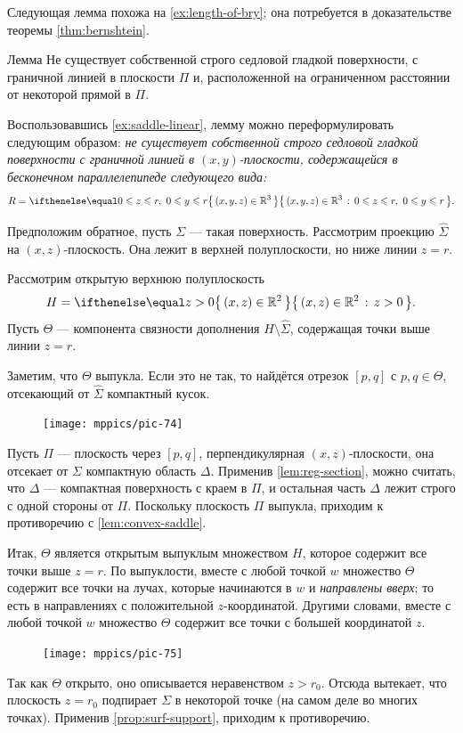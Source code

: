 Следующая лемма похожа на \ref{ex:length-of-bry};
она потребуется в доказательстве теоремы \ref{thm:bernshtein}.

\begin{thm}{Лемма}\label{lem:region}
Не существует собственной строго седловой гладкой поверхности, с граничной линией в плоскости $\Pi$ и, расположенной на ограниченном расстоянии от некоторой прямой в $\Pi$.
\end{thm}

Воспользовавшись \ref{ex:saddle-linear}, лемму можно переформулировать следующим образом:
\textit{не существует собственной строго седловой гладкой поверхности 
с граничной линией в $(x,y)$-плоскости,
содержащейся в бесконечном параллелепипеде следующего вида:}
\[R=\set{(x,y,z)\in\mathbb{R}^3}{0\le z\le r,\  0\le y\le r}.\]

Предположим обратное, пусть $\Sigma$ --- такая поверхность.
Рассмотрим проекцию $\hat \Sigma$ на $(x,z)$-плоскость.
Она лежит в верхней полуплоскости, но ниже линии $z=r$.

Рассмотрим открытую верхнюю полуплоскость
\[H=\set{(x,z)\in \mathbb{R}^2}{z> 0}.\] 
Пусть $\Theta$ --- компонента связности дополнения $H\setminus \hat \Sigma$, содержащая точки выше линии $z=r$.

Заметим, что $\Theta$ выпукла.
Если это не так, то найдётся отрезок $[p,q]$ с $p,q\in \Theta$, отсекающий от $\hat\Sigma$ компактный кусок.
\begin{figure}[!ht]
\vskip-1mm
\centering
\texttt{[image: mppics/pic-74]}
\vskip-1mm
\end{figure}
Пусть $\Pi$ --- плоскость через $[p,q]$, перпендикулярная $(x,z)$-плоскости, она отсекает от $\Sigma$ компактную область $\Delta$.
Применив \ref{lem:reg-section}, можно считать, что $\Delta$ --- компактная поверхность с краем в $\Pi$, и остальная часть $\Delta$ лежит строго с одной стороны от $\Pi$.
Поскольку плоскость $\Pi$ выпукла, приходим к противоречию с \ref{lem:convex-saddle}.

Итак, $\Theta$ является открытым выпуклым множеством $H$, которое содержит все точки выше $z=r$.
По выпуклости, вместе с любой точкой $w$ множество $\Theta$ содержит все точки на лучах, которые начинаются в $w$ и \textit{направлены вверх}; то есть в направлениях с положительной $z$-координатой. 
Другими словами, вместе с любой точкой $w$
множество $\Theta$ содержит все точки с большей координатой $z$.
\begin{figure}[!ht]
\vskip-1mm
\centering
\texttt{[image: mppics/pic-75]}
\vskip-1mm
\end{figure}
Так как $\Theta$ открыто, оно описывается неравенством $z>r_0$.
Отсюда вытекает, что плоскость $z=r_0$ подпирает $\Sigma$ в некоторой точке (на самом деле во многих точках).
Применив \ref{prop:surf-support}, приходим к противоречию.
\qeds



